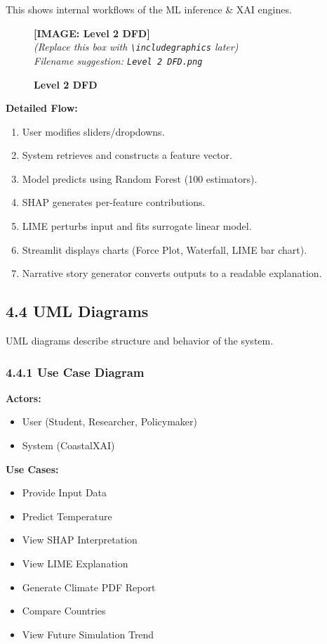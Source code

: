 \documentclass[12pt, a4paper]{article}
\newcommand{\imageplaceholder}[2]{
  \begin{figure}[H]
    \centering
    \begin{tcolorbox}[colback=white, colframe=black, width=0.8\textwidth, arc=0mm, boxrule=1pt]
      \centering
      \vspace{#2}
      \textbf{\Large [IMAGE: #1]}\\
      \vspace{0.5cm}
      \textit{(Replace this box with \texttt{\textbackslash includegraphics} later)}\\
      \textit{Filename suggestion: \texttt{#1.png}}
      \vspace{#2}
    \end{tcolorbox}
    \caption{\textbf{#1}}
    \label{fig:#1}
  \end{figure}
}
\begin{document}
This shows internal workflows of the ML inference & XAI engines.

\imageplaceholder{Level 2 DFD}{6cm}

\noindent
\textbf{Detailed Flow:}

\begin{enumerate}
    \item User modifies sliders/dropdowns.
    \item System retrieves and constructs a feature vector.
    \item Model predicts using Random Forest (100 estimators).
    \item SHAP generates per-feature contributions.
    \item LIME perturbs input and fits surrogate linear model.
    \item Streamlit displays charts (Force Plot, Waterfall, LIME bar chart).
    \item Narrative story generator converts outputs to a readable explanation.
\end{enumerate}

\subsection{\textbf{4.4 UML Diagrams}}

UML diagrams describe structure and behavior of the system.

\subsubsection{\textbf{4.4.1 Use Case Diagram}}

\textbf{Actors:}
\begin{itemize}
    \item User (Student, Researcher, Policymaker)
    \item System (CoastalXAI)
\end{itemize}

\textbf{Use Cases:}
\begin{itemize}
    \item Provide Input Data
    \item Predict Temperature
    \item View SHAP Interpretation
    \item View LIME Explanation
    \item Generate Climate PDF Report
    \item Compare Countries
    \item View Future Simulation Trend
\end{itemize}
\end{document}
